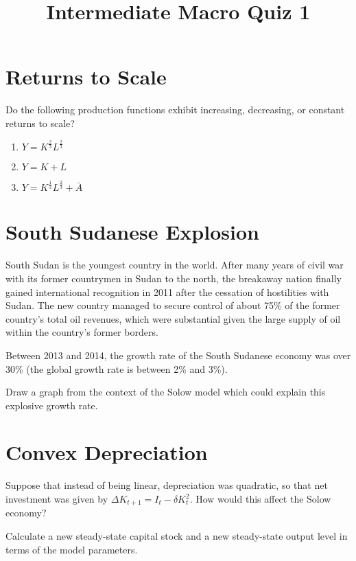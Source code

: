 \documentclass{article}
\begin{document}
\title{Intermediate Macro Quiz 1}

\maketitle

\section{Returns to Scale}

Do the following production functions exhibit increasing, decreasing, or constant returns to scale?

\begin{enumerate}
\item $Y = K^{\frac23} L^{\frac23}$

\item $Y = K + L$

\item $Y = K^{\frac13} L^{\frac23} + \bar{A}$
\end{enumerate}

\section{South Sudanese Explosion}

South Sudan is the youngest country in the world. After many years of civil war with its former countrymen in Sudan to the north, the breakaway nation finally gained international recognition in 2011 after the cessation of hostilities with Sudan. The new country managed to secure control of about 75\% of the former country's total oil revenues, which were substantial given the large supply of oil within the country's former borders.

Between 2013 and 2014, the growth rate of the South Sudanese economy was over 30\% (the global growth rate is between 2\% and 3\%).

Draw a graph from the context of the Solow model which could explain this explosive growth rate.

\section{Convex Depreciation}

Suppose that instead of being linear, depreciation was quadratic, so that net investment was given by $\Delta K_{t+1} = I_t - \delta K_t^2$. How would this affect the Solow economy?

Calculate a new steady-state capital stock and a new steady-state output level in terms of the model parameters.
\end{document}
